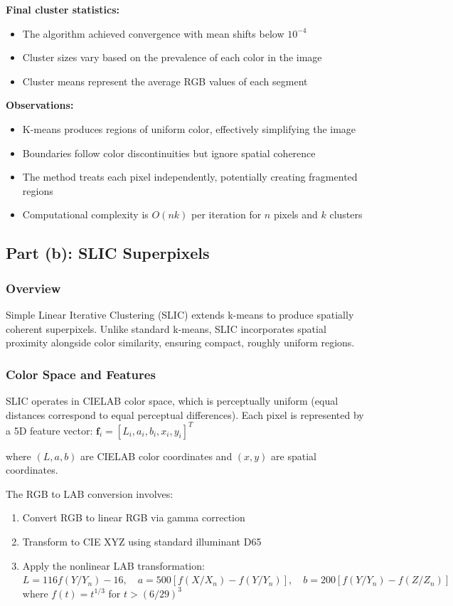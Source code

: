 \documentclass[11pt,a4paper]{article}
\begin{document}
\textbf{Final cluster statistics:}
\begin{itemize}
    \item The algorithm achieved convergence with mean shifts below $10^{-4}$
    \item Cluster sizes vary based on the prevalence of each color in the image
    \item Cluster means represent the average RGB values of each segment
\end{itemize}

\textbf{Observations:}
\begin{itemize}
    \item K-means produces regions of uniform color, effectively simplifying the image
    \item Boundaries follow color discontinuities but ignore spatial coherence
    \item The method treats each pixel independently, potentially creating fragmented regions
    \item Computational complexity is $O(nk)$ per iteration for $n$ pixels and $k$ clusters
\end{itemize}

\subsection{Part (b): SLIC Superpixels }

\subsubsection{Overview}
Simple Linear Iterative Clustering (SLIC) extends k-means to produce spatially coherent superpixels. Unlike standard k-means, SLIC incorporates spatial proximity alongside color similarity, ensuring compact, roughly uniform regions.

\subsubsection{Color Space and Features}
SLIC operates in CIELAB color space, which is perceptually uniform (equal distances correspond to equal perceptual differences). Each pixel is represented by a 5D feature vector:
$\mathbf{f}_i = [L_i, a_i, b_i, x_i, y_i]^T$

where $(L, a, b)$ are CIELAB color coordinates and $(x, y)$ are spatial coordinates.

The RGB to LAB conversion involves:
\begin{enumerate}
    \item Convert RGB to linear RGB via gamma correction
    \item Transform to CIE XYZ using standard illuminant D65
    \item Apply the nonlinear LAB transformation:
    $L = 116f(Y/Y_n) - 16, \quad a = 500[f(X/X_n) - f(Y/Y_n)], \quad b = 200[f(Y/Y_n) - f(Z/Z_n)]$
    where $f(t) = t^{1/3}$ for $t > (6/29)^3$
\end{enumerate}
\end{document}
